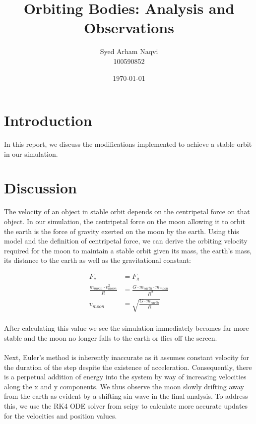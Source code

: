 \documentclass[a4paper,12pt]{article}
\title{Orbiting Bodies: Analysis and Observations}
\author{Syed Arham Naqvi \\ 100590852}
\date{\today}
\begin{document}
\maketitle

\section{Introduction}
In this report, we discuss the modifications implemented to achieve a stable orbit in our simulation.

\section{Discussion}
The velocity of an object in stable orbit depends on the centripetal force on that object. In our simulation, the centripetal force on the moon allowing it to orbit the earth
is the force of gravity exerted on the moon by the earth. Using this model and the definition of centripetal force, we can derive the orbiting velocity required for the moon to maintain
a stable orbit given its mass, the earth's mass, its distance to the earth as well as the gravitational constant:

\begin{align*}
    F_{c}                                 &= F_{g} \\
    \frac{m_{moon} \cdot v_{moon}^{2}}{R} &= \frac{G \cdot m_{earth} \cdot m_{moon}}{R^{2}} \\
    v_{moon}                              &= \sqrt{\frac{G \cdot m_{earth}}{R}} \\
\end{align*}

After calculating this value we see the simulation immediately becomes far more stable
and the moon no longer falls to the earth or flies off the screen.
\\
\\
Next, Euler's method is inherently inaccurate as it assumes constant velocity for the
duration of the step despite the existence of acceleration. Consequently, there is a
perpetual addition of energy into the system by way of increasing velocities along the
x and y components. We thus observe the moon slowly drifting away from the earth as
evident by a shifting sin wave in the final analysis.
To address this, we use the RK4 ODE solver from scipy to calculate more accurate updates
for the velocities and position values.
\end{document}
